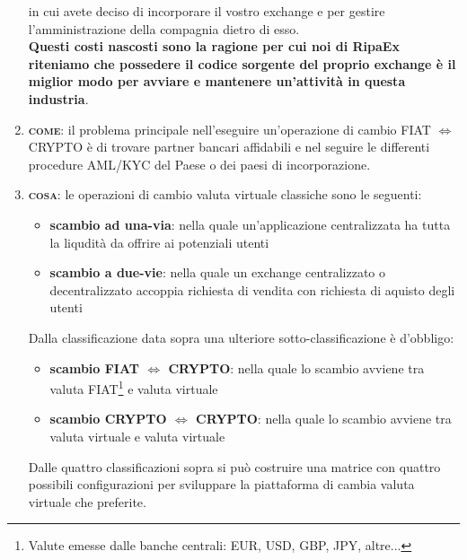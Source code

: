\documentclass[11pt,fleqn]{book} %
\begin{document}
\begin{enumerate}
	in cui avete deciso di incorporare il vostro exchange e per gestire l'amministrazione della compagnia dietro di esso.\\
	\textbf{Questi costi nascosti sono la ragione per cui noi di RipaEx riteniamo che possedere il codice sorgente del proprio exchange è il miglior
	modo per avviare e mantenere un'attività in questa industria}.
	\item \textbf{\textsc{come}}: il problema principale nell'eseguire un'operazione di cambio FIAT $\Leftrightarrow$ CRYPTO è di trovare partner bancari affidabili
	e nel seguire le differenti procedure AML/KYC del Paese o dei paesi di incorporazione.
	\item \textbf{\textsc{cosa}}: le operazioni di cambio valuta virtuale classiche sono le seguenti:
		\begin{itemize}
			\item \textbf{scambio ad una-via}: nella quale un'applicazione centralizzata ha tutta la liqudità da offrire ai potenziali utenti
			\item \textbf{scambio a due-vie}: nella quale un exchange centralizzato o decentralizzato accoppia richiesta di vendita con richiesta di aquisto degli utenti
		\end{itemize}
		Dalla classificazione data sopra una ulteriore sotto-classificazione è d'obbligo:
		\begin{itemize}
			\item \textbf{scambio FIAT $\Leftrightarrow$ CRYPTO}: nella quale lo scambio avviene tra valuta FIAT\footnote{Valute emesse dalle banche centrali: EUR, USD, GBP, JPY, altre...}
			e valuta virtuale
			\item \textbf{scambio CRYPTO $\Leftrightarrow$ CRYPTO}: nella quale lo scambio avviene tra valuta virtuale e valuta virtuale
		\end{itemize}
	Dalle quattro classificazioni sopra si può costruire una matrice con quattro possibili configurazioni per sviluppare la piattaforma di cambia valuta virtuale
	che preferite.
	\begin{tcbraster}[raster columns=3,raster rows=1,raster height=0.8cm,
		valign=center, halign=center,
		enhanced,size=small,sharp corners,colframe=azure(colorwheel),coltext=white,
		colback=azure(colorwheel),fit algorithm=hybrid* ]
		\tcboxfit{}
	\end{tcbraster}
	\begin{tcbraster}[raster columns=3,raster rows=2,raster height=5cm,
		valign=center, halign=center,
		enhanced,size=small,sharp corners,colframe=silver,coltext=black,
		colback=silver,fit algorithm=hybrid* ]
	

\end{tcbraster}
\end{enumerate}
\end{document}

